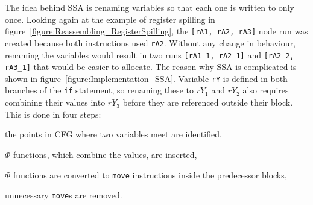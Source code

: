 \documentclass[12pt,twoside,notitlepage]{report}
\begin{document}
The idea behind SSA is renaming variables so that each one is written to only once. Looking again at the example of register spilling in figure~\ref{figure:Reassembling_RegisterSpilling}, the \verb$[rA1, rA2, rA3]$ node run was created because both instructions used \verb$rA2$. Without any change in behaviour, renaming the variables would result in two runs \verb$[rA1_1, rA2_1]$ and \verb$[rA2_2, rA3_1]$ that would be easier to allocate. The reason why SSA is complicated is shown in figure~\ref{figure:Implementation_SSA}. Variable \verb$rY$ is defined in both branches of the \verb$if$ statement, so renaming these to $rY_1$ and $rY_2$ also requires combining their values into $rY_3$ before they are referenced outside their block. This is done in four steps: 
\begin{inparaenum}[(i)]
\item the points in CFG where two variables meet are identified,
\item $\Phi$ functions, which combine the values, are inserted,
\item $\Phi$ functions are converted to \texttt{move} instructions inside the predecessor blocks,
\item unnecessary \texttt{move}s are removed.
\end{inparaenum}
\end{document}
